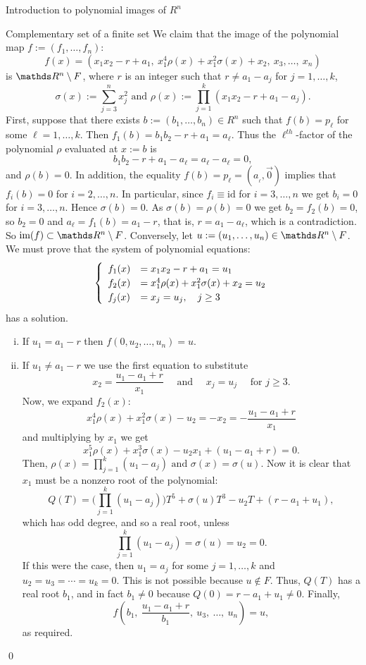 \documentclass[11pt, a4paper, english, twoside, notitlepage, openright]{report}
\begin{document}
\begin{chapter}{Introduction to polynomial images of $R^n$}
\begin{section}{Complementary set of a finite set}
We claim that the image of the polynomial map $f:=(f_1,\dots,f_n)$:
$$
f(x)=\left(x_1x_2-r+a_1,\ x_1^{4}\rho(x)+x_1^{2}\sigma(x)+x_2,\ x_3,\dots,\ x_n\right)
$$
is $\R^n\setminus F$, where $r$ is an integer such that $r\neq a_1-a_j$ for $j=1,\dots,k$,  
$$
\sigma(x):=\sum_{j=3}^n x_j^2 \text{ and } \rho(x):=\prod_{j=1}^k(x_1x_2-r+a_1-a_j).
$$
First, suppose that there exists $b:=(b_{1},\dots,b_{n})\in R^n$ such that $f(b)=p_\ell$ for some $\ell=1,\dots,k$. Then $f_1(b)=b_1b_2-r+a_1=a_\ell$. Thus the $\ell^{th}$-factor of the polynomial $\rho$ evaluated at $x:=b$ is
$$
b_1b_2-r+a_1-a_\ell=a_\ell-a_\ell=0,
$$		 
and $\rho(b)=0$. In addition, the equality $f(b)=p_\ell=(a_{_\ell},\vec{0})$ implies that $f_i(b)=0$ for $i=2,\dots,n$. In particular, since $f_i\equiv\text{id}$ for $i=3,\dots,n$ we get $b_i=0$ for $i=3,\dots,n$. Hence $\sigma(b)=0$. As $\sigma(b)=\rho(b)=0$ we get $b_2=f_2(b)= 0$, so $b_2=0$ and $a_{\ell}=f_1(b)=a_1-r$, that is, $r=a_1-a_\ell$, which is a contradiction. So $\text{im}(f)\subset \R^n\setminus F$.
Conversely, let $u:=(u_1,\dots,u_n)\in\R^n\setminus F$. We must prove that the system of polynomial equations:
\[ \left\{ \def\arraystretch{1.2}
\begin{array}{ll} 
f_1(x)&=x_1x_2-r+a_1=u_1 \\
f_2(x)&=x_1^4\rho(x)+x_1^2\sigma(x)+x_2=u_2 \\
f_j(x)&=x_j=u_j,\quad j\geq 3
\end{array} 
\right.  \]
has a solution.
\begin{enumerate}[(i)]
\item If $u_1=a_1-r$ then $f(0,u_2,\dots,u_n)=u$.
\item If $u_1\neq a_1-r$ we use the first equation to substitute $$x_2=\frac{u_1-a_1+r}{x_1} \quad \text{ and } \quad x_j=u_j \quad \text{ for } j\geq 3.$$ Now, we expand $f_2(x)$:
$$
x_1^4\rho(x)+x_1^2\sigma(x)-u_2=-x_2=-\frac{u_1-a_1+r}{x_1}
$$ 
and multiplying by $x_1$ we get 
$$
x_1^5\rho(x)+x_1^3\sigma(x)-u_2x_1+(u_1-a_1+r)=0.
$$ 
Then, $\rho(x)=\prod_{j=1}^k(u_1-a_j) \text{ and } \sigma(x)=\sigma(u)$. Now it is clear that $x_1$ must be a nonzero root of the polynomial:
$$
Q(T)=\Big(\prod_{j=1}^k(u_1-a_j)\Big)T^{5}+\sigma(u)T^{3}-u_2T+(r-a_1+u_1),
$$
which has odd degree, and so a real root, unless 
$$
\prod_{j=1}^k(u_1-a_j)=\sigma(u)=u_2=0.
$$ 
If this were the case, then $u_1=a_j$ for some $j= 1,\dots,k$ and $u_2=u_3=\cdots=u_k=0$. This is not possible because $u\not\in F$. Thus, $Q(T)$ has a real root $b_1$, and in fact $b_1\neq0$ because $Q(0)=r-a_1+u_1\neq 0$.
Finally, 
$$
f\left(b_1,\ \frac{u_1-a_1+r}{b_1},\ u_3,\ \dots,\ u_n\right)=u,
$$
as required.
\end{enumerate}
\qed
\end{section}
\end{chapter}
\end{document}
